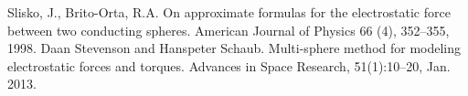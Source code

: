 \begin{thebibliography}{99}
 Slisko, J., Brito-Orta, R.A. On approximate formulas for the electrostatic force between two conducting spheres. American Journal of Physics 66 (4), 352–355, 1998.
 Daan Stevenson and Hanspeter Schaub. Multi-sphere method for modeling electrostatic forces and torques. Advances in Space Research, 51(1):10–20, Jan. 2013.
\end{thebibliography}